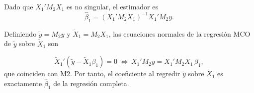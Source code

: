 \documentclass{article}
\begin{document}
Dado que $X_1'M_2X_1$ es no singular, el estimador es
\begin{equation}
\hat\beta_1=(X_1'M_2X_1)^{-1}X_1'M_2y. \label{eq:beta1hat}
\end{equation}

Definiendo $\tilde y=M_2y$ y $\tilde X_1=M_2X_1$, las ecuaciones normales de la regresión 
\indent MCO de $\tilde y$ sobre $\tilde X_1$ son


\begin{equation}
\tilde X_1'(\tilde y-\tilde X_1\beta_1)=0
\ \Longleftrightarrow\
X_1'M_2y=X_1'M_2X_1\,\beta_1, \label{eq:tilde-normal}
\end{equation}
\indent que coinciden con M2. Por tanto, el coeficiente al regredir $\tilde y$ sobre $\tilde X_1$ es 
\indent exactamente $\hat\beta_1$ de la regresión completa.
\end{document}
